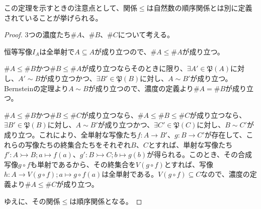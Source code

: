 \documentclass[dvipdfmx]{jsarticle}
\begin{document}
この定理を示すときの注意点として、関係$\leq$は自然数の順序関係とは別に定義されていることが挙げられる。
\begin{proof}
3つの濃度たち$\# A$、$\# B$、$\# C$について考える。\par
恒等写像$I_{A}$は全単射で$A \subseteq A$が成り立つので、$\# A \leq \# A$が成り立つ。\par
$\# A \leq \# B$かつ$\# B \leq \# A$が成り立つならそのときに限り、$\exists A'\in \mathfrak{P}(A)$に対し、$A' \sim B$が成り立つかつ、$\exists B'\in \mathfrak{P}(B)$に対し、$A \sim B'$が成り立つ。Bernsteinの定理より$A \sim B$が成り立つので、濃度の定義より$\# A = \# B$が成り立つ。\par
$\# A \leq \# B$かつ$\# B \leq \# C$が成り立つなら、$\# A \leq \# B \leq \# C$が成り立つなら、$\exists B'\in \mathfrak{P}(B)$に対し、$A \sim B'$が成り立つかつ、$\exists C'\in \mathfrak{P}(C)$に対し、$B \sim C'$が成り立つ。これにより、全単射な写像たち$f:A \rightarrow B'$、$g:B \rightarrow C'$が存在して、これらの写像たちの終集合たちをそれぞれ$B$、$C$とすれば、単射な写像たち$f':A \rightarrowtail B;a \mapsto f(a)$、$g':B \rightarrowtail C;b \mapsto g(b)$が得られる。このとき、その合成写像$g \circ f$も単射であるから、その終集合を$V(g \circ f)$とすれば、写像$h:A \rightarrow V(g \circ f);a \mapsto g \circ f(a)$は全単射である。$V(g \circ f) \subseteq C$なので、濃度の定義より$\# A \leq \# C$が成り立つ。\par
ゆえに、その関係$\leq$は順序関係となる。
\end{proof}
\end{document}
